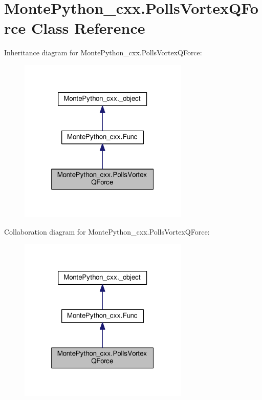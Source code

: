\hypertarget{classMontePython__cxx_1_1PollsVortexQForce}{}\section{Monte\+Python\+\_\+cxx.\+Polls\+Vortex\+Q\+Force Class Reference}
\label{classMontePython__cxx_1_1PollsVortexQForce}


Inheritance diagram for Monte\+Python\+\_\+cxx.\+Polls\+Vortex\+Q\+Force\+:
\nopagebreak
\begin{figure}[H]
\begin{center}
\leavevmode
\includegraphics[width=229pt]{classMontePython__cxx_1_1PollsVortexQForce__inherit__graph}
\end{center}
\end{figure}


Collaboration diagram for Monte\+Python\+\_\+cxx.\+Polls\+Vortex\+Q\+Force\+:
\nopagebreak
\begin{figure}[H]
\begin{center}
\leavevmode
\includegraphics[width=229pt]{classMontePython__cxx_1_1PollsVortexQForce__coll__graph}
\end{center}
\end{figure}
